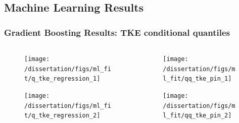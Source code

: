 \documentclass[t, pdftex]{beamer}
\begin{document}
\subsection*{Machine Learning Results}
\begin{frame}
\frametitle{Gradient Boosting Results: TKE conditional quantiles}
\vspace{-42pt}
\begin{columns}
    \begin{column}{0.5\textwidth}
        \begin{figure}[H]%
            \texttt{[image: /dissertation/figs/ml\_fit/q\_tke\_regression\_1]}
        \end{figure}
        \vspace{-26pt}
        \begin{figure}[H]%
            \texttt{[image: /dissertation/figs/ml\_fit/q\_tke\_regression\_2]}
        \end{figure}
    \end{column}
    \begin{column}{0.5\textwidth}
        \begin{figure}[H]%
            \texttt{[image: /dissertation/figs/ml\_fit/qq\_tke\_pin\_1]}
        \end{figure}
        \vspace{-26pt}
        \begin{figure}[H]%
            \texttt{[image: /dissertation/figs/ml\_fit/qq\_tke\_pin\_2]}
        \end{figure}
    \end{column}
\end{columns}
\end{frame}
\end{document}
